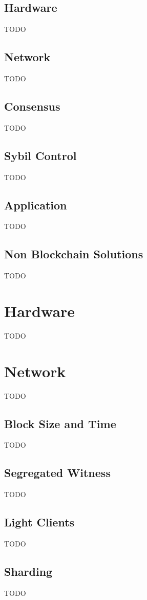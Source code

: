 \documentclass{article}
\begin{document}
\subsection{Hardware}
TODO

\subsection{Network}
TODO

\subsection{Consensus}
TODO

\subsection{Sybil Control}
TODO

\subsection{Application}
TODO

\subsection{Non Blockchain Solutions}
TODO

\section{Hardware}
TODO


\section{Network}
TODO

\subsection{Block Size and Time}
TODO

\subsection{Segregated Witness}
TODO

\subsection{Light Clients}
TODO

\subsection{Sharding}
TODO
\end{document}
